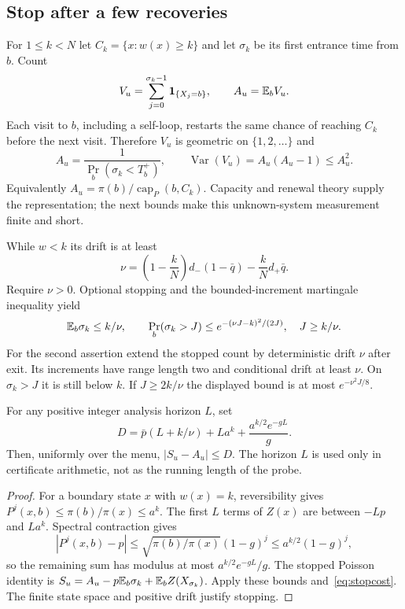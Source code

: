 \subsection{Stop after a few recoveries}
For $1\le k<N$ let $C_k=\{x:w(x)\ge k\}$ and let $\sigma_k$ be its first entrance time from $b$. Count
\begin{equation}
 V_u=\sum_{j=0}^{\sigma_k-1}\mathbf 1_{\{X_j=b\}},\qquad A_u=\mathbb E_b V_u.
 \label{eq:score}
\end{equation}
Each visit to $b$, including a self-loop, restarts the same chance of reaching $C_k$ before the next visit. Therefore $V_u$ is geometric on $\{1,2,\ldots\}$ and
\begin{equation}
 A_u=\frac1{\Pr_b(\sigma_k<T_b^+)},\qquad
 \operatorname{Var}(V_u)=A_u(A_u-1)\le A_u^2.
 \label{eq:geometric}
\end{equation}
Equivalently $A_u=\pi(b)/\operatorname{cap}_P(b,C_k)$. Capacity and renewal theory supply the representation; the next bounds make this unknown-system measurement finite and short.

While $w<k$ its drift is at least
\begin{equation}
 \nu=\left(1-\frac kN\right)d_-(1-\bar q)-\frac kN d_+\bar q.
 \label{eq:drift}
\end{equation}
Require $\nu>0$. Optional stopping and the bounded-increment martingale inequality yield
\begin{equation}
 \mathbb E_b\sigma_k\le k/\nu,\qquad
 \Pr_b(\sigma_k>J)\le e^{-(\nu J-k)^2/(2J)},\quad J\ge k/\nu.
 \label{eq:stopcost}
\end{equation}
For the second assertion extend the stopped count by deterministic drift $\nu$ after exit. Its increments have range length two and conditional drift at least $\nu$. On $\sigma_k>J$ it is still below $k$. If $J\ge2k/\nu$ the displayed bound is at most $e^{-\nu^2J/8}$.

\begin{theorem}\label{thm:localreturn}
For any positive integer analysis horizon $L$, set
\begin{equation}
 D=\bar p(L+k/\nu)+La^k+\frac{a^{k/2}e^{-gL}}g.
 \label{eq:D}
\end{equation}
Then, uniformly over the menu, $|S_u-A_u|\le D$. The horizon $L$ is used only in certificate arithmetic, not as the running length of the probe.
\end{theorem}
\begin{proof}
For a boundary state $x$ with $w(x)=k$, reversibility gives $P^j(x,b)\le\pi(b)/\pi(x)\le a^k$. The first $L$ terms of $Z(x)$ are between $-Lp$ and $La^k$. Spectral contraction gives
\[
 |P^j(x,b)-p|\le\sqrt{\pi(b)/\pi(x)}(1-g)^j\le a^{k/2}(1-g)^j,
\]
so the remaining sum has modulus at most $a^{k/2}e^{-gL}/g$. The stopped Poisson identity is
$S_u=A_u-p\mathbb E_b\sigma_k+\mathbb E_bZ(X_{\sigma_k})$.
Apply these bounds and~\eqref{eq:stopcost}. The finite state space and positive drift justify stopping.
\end{proof}

